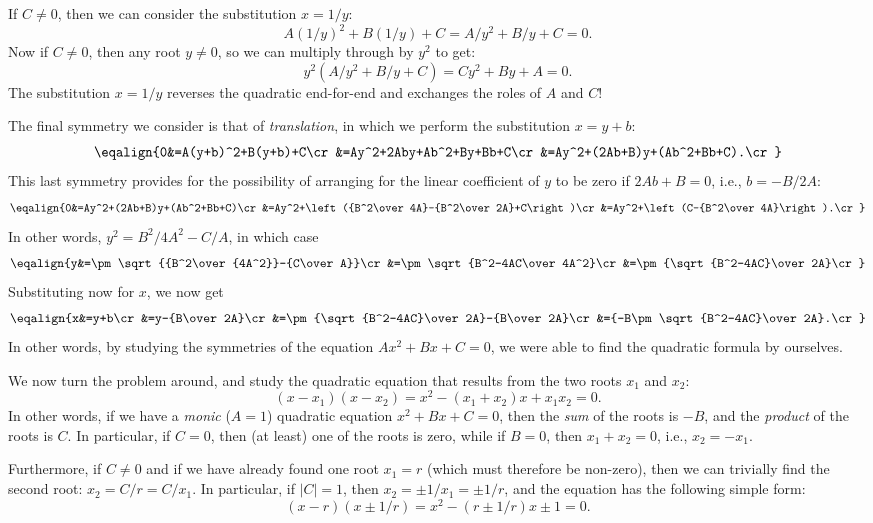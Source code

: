 \documentclass[twocolumn,epsf]{snBaker}
\begin{document}
If $C\neq 0$, then we can consider the substitution $x=1/y$:
$$A(1/y)^2+B(1/y)+C=A/{y^2}+B/y+C=0.$$
Now if $C\neq 0$, then any root $y\neq 0$, so we can multiply through by $y^2$
to get:
$$y^2(A/{y^2}+B/y+C)=Cy^2+By+A=0.$$
The substitution $x=1/y$ reverses the quadratic end-for-end and
exchanges the roles of $A$ and $C$!

The final symmetry we consider is that of {\it translation}, in which
we perform the substitution $x=y+b$:
$$\eqalign{0&=A(y+b)^2+B(y+b)+C\cr
&=Ay^2+2Aby+Ab^2+By+Bb+C\cr
&=Ay^2+(2Ab+B)y+(Ab^2+Bb+C).\cr}$$
This last symmetry provides for the possibility of arranging for the
linear coefficient of $y$ to be zero if $2Ab+B=0$, i.e., $b=-B/2A$:
$$\eqalign{0&=Ay^2+(2Ab+B)y+(Ab^2+Bb+C)\cr
&=Ay^2+\left({B^2\over 4A}-{B^2\over 2A}+C\right)\cr
&=Ay^2+\left(C-{B^2\over 4A}\right).\cr}$$
In other words, $y^2=B^2/{4A^2}-C/A$, in which case
$$\eqalign{y&=\pm\sqrt{{B^2\over{4A^2}}-{C\over A}}\cr
&=\pm\sqrt{B^2-4AC\over 4A^2}\cr
&=\pm{\sqrt{B^2-4AC}\over 2A}\cr}$$
Substituting now for $x$, we now get
$$\eqalign{x&=y+b\cr
&=y-{B\over 2A}\cr
&=\pm{\sqrt{B^2-4AC}\over 2A}-{B\over 2A}\cr
&={-B\pm\sqrt{B^2-4AC}\over 2A}.\cr}$$
In other words, by studying the symmetries of the equation
$Ax^2+Bx+C=0$, we were able to find the quadratic formula
by ourselves.

We now turn the problem around, and study the quadratic equation that
results from the two roots $x_1$ and $x_2$:
$$(x-x_1)(x-x_2)=x^2-(x_1+x_2)x+x_1x_2=0.$$
In other words, if we have a {\it monic} ($A=1$) quadratic equation
$x^2+Bx+C=0$, then the {\it sum} of the roots is $-B$, and the {\it
product} of the roots is $C$.  In particular, if $C=0$, then (at
least) one of the roots is zero, while if $B=0$, then $x_1+x_2=0$,
i.e., $x_2=-x_1$.

Furthermore, if $C\neq 0$ and if we have already found one root
$x_1=r$ (which must therefore be non-zero), then we can trivially find
the second root: $x_2=C/r=C/x_1$.  In particular, if $|C|=1$, then
$x_2=\pm 1/x_1=\pm 1/r$, and the equation has the following simple
form:
$$(x-r)(x\pm 1/r)=x^2-(r\pm 1/r)x\pm 1=0.$$
\end{document}
